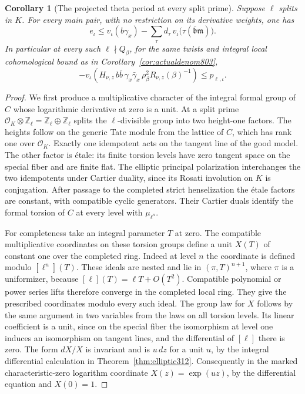 \documentclass[a4paper,11pt]{article}
\newtheorem{corollary}[proposition]{Corollary}
\theoremstyle{definition}
\theoremstyle{remark}
\numberwithin{equation}{section}
\begin{document}
\begin{corollary}[The projected theta period at every split prime]
\leavevmode\label{cor:splitperiod858}
Suppose \(\ell\) splits in \(K\). For every main pair, with
no restriction on its derivative weights, one has
\[
 e_\iota\le v_\iota(b\gamma_x)
       -\sum_\tau d_\tau\,v_\iota
                      \bigl(\tau(\overline{\mathfrak b}\mathfrak m)\bigr).
\]
In particular at every such \(\ell\nmid Q_\beta\), for the
same twists and integral local cohomological bound as in
Corollary~\ref{cor:actualdenom803},
\[
 -v_\iota\!\left(H_{\nu,z}\,b\bar b\,\gamma_x\bar\gamma_x\,
               \rho_\beta^2 R_{\nu,z}(\beta)^{-1}\right)
                         \le p_{\ell,\iota}.
\]
\end{corollary}
\begin{proof}
We first produce a multiplicative character of the integral
formal group of \(C\) whose logarithmic derivative at zero
is a unit. At a split prime
\(\mathcal O_K\otimes\mathbb Z_\ell=\mathbb Z_\ell\oplus\mathbb Z_\ell\)
splits the \(\ell\)-divisible group into two height-one
factors. The heights follow on the generic Tate module
from the lattice of \(C\), which has rank one over
\(\mathcal O_K\). Exactly one idempotent acts on the tangent
line of the good model. The other factor is \'etale: its
finite torsion levels have zero tangent space on the special
fiber and are finite flat. The elliptic principal polarization
interchanges the two idempotents under Cartier duality, since
its Rosati involution on \(K\) is conjugation. After passage
to the completed strict henselization the \'etale factors are
constant, with compatible cyclic generators. Their Cartier
duals identify the formal torsion of \(C\) at every level
with \(\mu_{\ell^n}\).

For completeness take an integral parameter \(T\) at zero.
The compatible multiplicative coordinates on these torsion
groups define a unit \(X(T)\) of constant one over the completed
ring. Indeed at level \(n\) the coordinate is defined modulo
\([\ell^n](T)\). These ideals are nested and lie in
\((\pi,T)^{n+1}\), where \(\pi\) is a uniformizer, because
\([\ell](T)=\ell T+O(T^2)\). Compatible polynomial or power
series lifts therefore converge in the completed local ring.
They give the prescribed coordinates modulo every such ideal.
The group law for \(X\) follows by the same argument in two
variables from the laws on all torsion levels. Its linear
coefficient is a unit, since on the special fiber the
isomorphism at level one induces an isomorphism on tangent
lines, and the differential of \([\ell]\) there is zero.
The form \(dX/X\) is invariant and is \(u\,dz\) for a unit
\(u\), by the integral differential calculation in
Theorem~\ref{thm:elliptic312}. Consequently in the marked
characteristic-zero logarithm coordinate
\(X(z)=\exp(u z)\), by the differential equation and \(X(0)=1\).


\end{proof}
\end{document}
